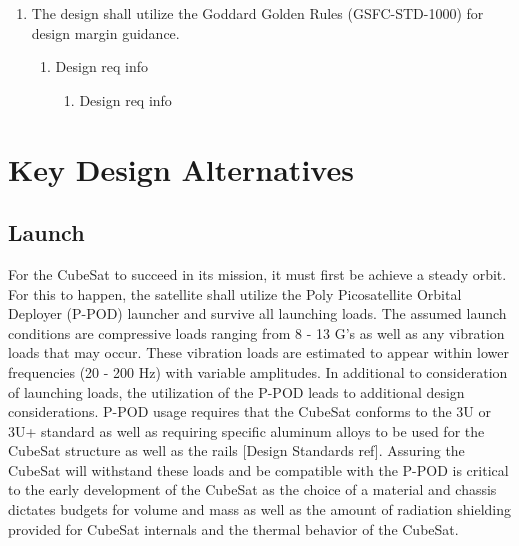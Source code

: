 \documentclass[3p]{elsarticle}
\begin{document}
\begin{enumerate}
\begin{enumerate}
        \item Design req info
        \begin{enumerate}
            \item Design req info
        \end{enumerate}
    \end{enumerate}
    \item The design shall utilize the Goddard Golden Rules (GSFC-STD-1000) for design margin guidance.
    \begin{enumerate}
        \item Design req info
        \begin{enumerate}
            \item Design req info
        \end{enumerate}
    \end{enumerate}
\end{enumerate}

\section{Key Design Alternatives}
\subsection{Launch}
For the CubeSat to succeed in its mission, it must first be achieve a steady orbit. For this to happen, the satellite shall utilize the Poly Picosatellite Orbital Deployer (P-POD) launcher and survive all launching loads. The assumed launch conditions are compressive loads ranging from 8 - 13 G's as well as any vibration loads that may occur. These vibration loads are estimated to appear within lower frequencies (20 - 200 Hz) with variable amplitudes. In additional to consideration of launching loads, the utilization of the P-POD leads to additional design considerations. P-POD usage requires that the CubeSat conforms to the 3U or 3U+ standard as well as requiring specific aluminum alloys to be used for the 
CubeSat structure as well as the rails [Design Standards ref]. Assuring the CubeSat will withstand these loads and be compatible with the P-POD is critical to the early development of the CubeSat as the choice of a material and chassis dictates budgets for volume and mass as well as the amount of radiation shielding provided for CubeSat internals and the thermal behavior of the CubeSat.
\end{document}
